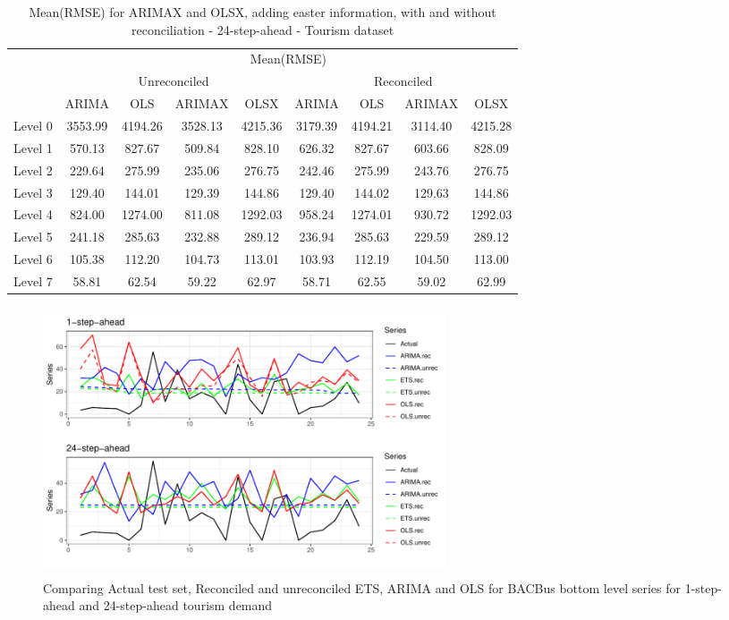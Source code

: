 \documentclass[11pt,a4paper,]{article}
\begin{document}
\begin{table}[t]

\caption{\label{tab:easterRMSE}Mean(RMSE) for ARIMAX and OLSX, adding easter information, with and without reconciliation - 24-step-ahead - Tourism dataset}
\centering
\begin{tabular}{ccccccccc}
\toprule
\multicolumn{1}{c}{} & \multicolumn{8}{c}{Mean(RMSE)} \\
\cmidrule(l{2pt}r{2pt}){2-9}
\multicolumn{1}{c}{} & \multicolumn{4}{c}{Unreconciled} & \multicolumn{4}{c}{Reconciled} \\
\cmidrule(l{2pt}r{2pt}){2-5} \cmidrule(l{2pt}r{2pt}){6-9}
 & ARIMA & OLS & ARIMAX & OLSX & ARIMA & OLS & ARIMAX & OLSX\\
\midrule
Level 0 & 3553.99 & 4194.26 & 3528.13 & 4215.36 & 3179.39 & 4194.21 & 3114.40 & 4215.28\\
Level 1 & 570.13 & 827.67 & 509.84 & 828.10 & 626.32 & 827.67 & 603.66 & 828.09\\
Level 2 & 229.64 & 275.99 & 235.06 & 276.75 & 242.46 & 275.99 & 243.76 & 276.75\\
Level 3 & 129.40 & 144.01 & 129.39 & 144.86 & 129.40 & 144.02 & 129.63 & 144.86\\
Level 4 & 824.00 & 1274.00 & 811.08 & 1292.03 & 958.24 & 1274.01 & 930.72 & 1292.03\\
Level 5 & 241.18 & 285.63 & 232.88 & 289.12 & 236.94 & 285.63 & 229.59 & 289.12\\
Level 6 & 105.38 & 112.20 & 104.73 & 113.01 & 103.93 & 112.19 & 104.50 & 113.00\\
Level 7 & 58.81 & 62.54 & 59.22 & 62.97 & 58.71 & 62.55 & 59.02 & 62.99\\
\bottomrule
\end{tabular}
\end{table}

\begin{figure}

{\centering \includegraphics[width=450px,height=300px]{hcf_files/figure-latex/forecstrolling24tourism-1} 

}

\caption{Comparing Actual test set, Reconciled and unreconciled ETS, ARIMA and OLS for BACBus bottom level series for 1-step-ahead and 24-step-ahead tourism demand}\label{fig:forecstrolling24tourism}
\end{figure}
\end{document}
